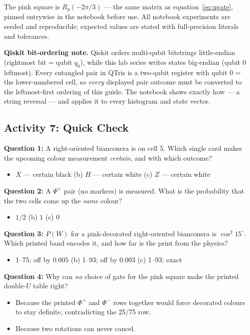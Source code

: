 \documentclass[a4paper,11pt]{article}
\begin{document}
\noindent The pink square is $R_y(-2\pi/3)$ --- the same matrix as
equation~\eqref{eq:ugate}, pinned entrywise in the notebook before use. All notebook
experiments are seeded and reproducible; expected values are stated with full-precision
literals and tolerances.

\begin{warningbox}
\textbf{Qiskit bit-ordering note.} Qiskit orders multi-qubit bitstrings little-endian
(rightmost bit = qubit $q_0$), while this lab series writes states big-endian (qubit 0
leftmost). Every entangled pair in QTris is a two-qubit register with qubit 0 = the
lower-numbered cell, so \emph{every} displayed pair outcome must be converted to the
leftmost-first ordering of this guide. The notebook shows exactly how --- a string
reversal --- and applies it to every histogram and state vector.
\end{warningbox}

\subsection{Activity 7: Quick Check}

\begin{reflectionbox}
\textbf{Question 1:} A right-oriented bianconera is on cell 5. Which single card makes
the upcoming colour measurement \emph{certain}, and with which outcome?
\begin{itemize}
    \item[(a)] $X$ --- certain black \qquad (b) $H$ --- certain white \qquad
               (c) $Z$ --- certain white
\end{itemize}

\textbf{Question 2:} A $\Psi^+$ pair (no markers) is measured. What is the probability
that the two cells come up the \emph{same} colour?
\begin{itemize}
    \item[(a)] $1/2$ \qquad (b) $1$ \qquad (c) $0$
\end{itemize}

\textbf{Question 3:} $P(W)$ for a pink-decorated right-oriented bianconera is
$\cos^2 15^\circ$. Which printed band encodes it, and how far is the print from the
physics?
\begin{itemize}
    \item[(a)] 1--75; off by $0.005$ \qquad (b) 1--93; off by $0.003$ \qquad
               (c) 1--93; exact
\end{itemize}

\textbf{Question 4:} Why can \emph{no} choice of gate for the pink square make the
printed double-$U$ table right?
\begin{itemize}
    \item[(a)] Because the printed $\Phi^+$ and $\Phi^-$ rows together would force
               decorated colours to stay definite, contradicting the 25/75 row.
    \item[(b)] Because two rotations can never cancel.
\end{itemize}
\end{reflectionbox}
\end{document}

